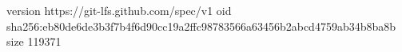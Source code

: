 version https://git-lfs.github.com/spec/v1
oid sha256:eb80de6de3b3f7b4f6d90cc19a2ffc98783566a63456b2abcd4759ab34b8ba8b
size 119371
